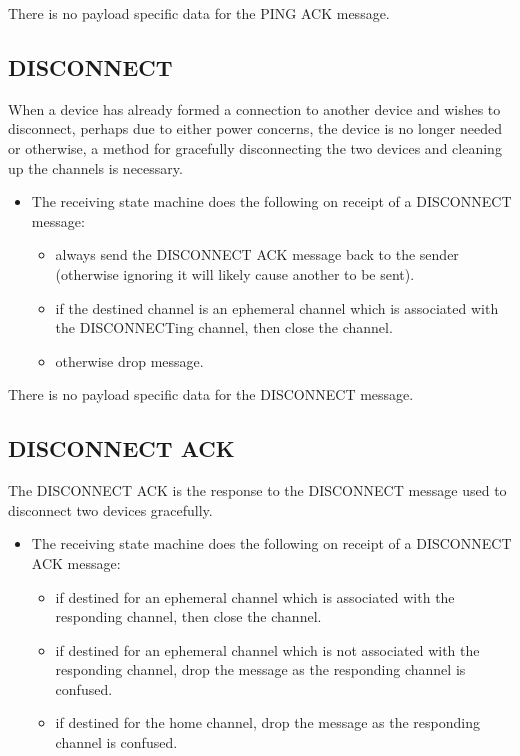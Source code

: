 There is no payload specific data for the PING ACK message.

\subsection{DISCONNECT} %
\label{sub:disconnect}
When a device has already formed a connection to another device and wishes to disconnect, perhaps due to either power concerns, the device is no longer needed or otherwise, a method for gracefully disconnecting the two devices and cleaning up the channels is necessary.

 \begin{itemize}
	\item []The receiving state machine does the following on receipt of a DISCONNECT message:
	\begin{itemize}
		\item always send the DISCONNECT ACK message back to the sender (otherwise ignoring it will likely cause another to be sent).
		\item if the destined channel is an ephemeral channel which is associated with the DISCONNECTing channel, then close the channel.
		\item otherwise drop message. 
	\end{itemize}
\end{itemize}

There is no payload specific data for the DISCONNECT message.

\subsection{DISCONNECT ACK} %
\label{sub:disconnect_ack}
The DISCONNECT ACK is the response to the DISCONNECT message used to disconnect two devices gracefully.

\begin{itemize}
	\item []The receiving state machine does the following on receipt of a DISCONNECT ACK message:
	\begin{itemize}
		\item if destined for an ephemeral channel which is associated with the responding channel, then close the channel.
		\item if destined for an ephemeral channel which is not associated with the responding channel, drop the message as the responding channel is confused. 
		\item if destined for the home channel, drop the message as the responding channel is confused. 
	\end{itemize}
\end{itemize}

